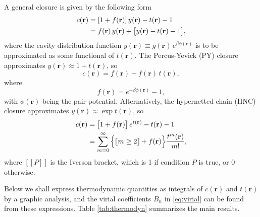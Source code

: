 \documentclass[preprint]{revtex4-1}
\newcommand{\vct}[1]{\mathbf{#1}}
\providecommand{\vr}{} %
\renewcommand{\vr}{\vct{r}}
\newcommand{\llbra}{[\![}
\newcommand{\llket}{]\!]}
\begin{document}
A general closure is given by the following form
%
\begin{align}
  c(\vr)
&= [1 + f(\vr)] \, y(\vr) - t(\vr) - 1
  \notag \\
&= f(\vr) \, y(\vr) + \big[ y(\vr) - t(\vr) - 1 \big],
  \label{eq:closure}
\end{align}
%
where the cavity distribution function $y(\vr) \equiv g(\vr) \, e^{ \beta \phi(\vr) }$
  is to be approximated as some functional of $t(\vr)$.
%
The Percus-Yevick (PY) closure\cite{percusyevick}
  approximates $y(\vr) \approx 1 + t(\vr)$, so
%
\begin{equation}
  c(\vr) = f(\vr) + f(\vr) \, t(\vr),
  \label{eq:py}
\end{equation}
where
\begin{equation}
  f(\vr) = e^{-\beta \phi(\vr)} - 1,
  \label{eq:fbond}
\end{equation}
with $\phi(\vr)$ being the pair potential.
%
Alternatively, the hypernetted-chain (HNC) closure\cite{
morita1958, *morita1959, *morita1960}
  approximates $y(\vr) \approx \exp { t(\vr) }$, so
%
\begin{align}
  c(\vr) &= \big[ 1 + f(\vr) \big] \, e^{t(\vr)} - t(\vr) - 1 \notag \\
         &= \sum_{m=0}^\infty
                \Big\{ \llbra m \ge 2 \llket + f(\vr) \Big\}
                \frac{ t^m(\vr) }{ m! },
  \label{eq:hnc}
\end{align}
%
where $\llbra P \llket$ is the Iverson bracket,
  which is 1 if condition $P$ is true, or 0 otherwise.

Below we shall express thermodynamic quantities
  as integrals of $c(\vr)$ and $t(\vr)$
  by a graphic analysis,
%
and the virial coefficients $B_n$ in \eqref{eq:virial}
  can be found from these expressions.
%
Table \ref{tab:thermodyn}
  summarizes the main results.

\ifdim \columnwidth < 4in
  \newcommand{\tabscale}{1.0}
\else
  \newcommand{\tabscale}{0.85}
\fi
\end{document}
